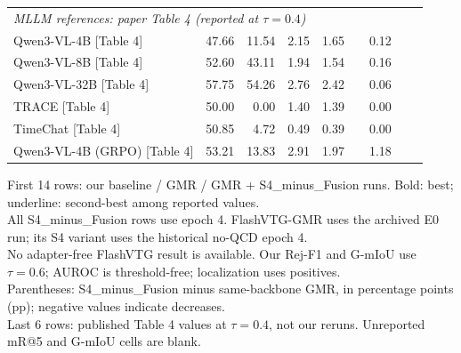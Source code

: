 \documentclass{article}
\begin{document}
\begin{table}[ht]
{\begin{tabular}{lrrrrrrrr}
\midrule
\multicolumn{9}{l}{\textit{MLLM references: paper Table 4 (reported at $\tau=0.4$)}} \\
Qwen3-VL-4B [Table 4] & 47.66 & 11.54 & 2.15 & 1.65 &  & 0.12 &  &  \\
Qwen3-VL-8B [Table 4] & 52.60 & 43.11 & 1.94 & 1.54 &  & 0.16 &  &  \\
Qwen3-VL-32B [Table 4] & 57.75 & 54.26 & 2.76 & 2.42 &  & 0.06 &  &  \\
TRACE [Table 4] & 50.00 & 0.00 & 1.40 & 1.39 &  & 0.00 &  &  \\
TimeChat [Table 4] & 50.85 & 4.72 & 0.49 & 0.39 &  & 0.00 &  &  \\
Qwen3-VL-4B (GRPO) [Table 4] & 53.21 & 13.83 & 2.91 & 1.97 &  & 1.18 &  &  \\
\bottomrule
\end{tabular}}
\par\smallskip\begin{minipage}{\textwidth}\footnotesize
First 14 rows: our baseline / GMR / GMR + S4\_minus\_Fusion runs. Bold: best; underline: second-best among reported values.\\
All S4\_minus\_Fusion rows use epoch 4. FlashVTG-GMR uses the archived E0 run; its S4 variant uses the historical no-QCD epoch 4.\\
No adapter-free FlashVTG result is available. Our Rej-F1 and G-mIoU use $\tau=0.6$; AUROC is threshold-free; localization uses positives.\\
Parentheses: S4\_minus\_Fusion minus same-backbone GMR, in percentage points (pp); negative values indicate decreases.\\
Last 6 rows: published Table 4 values at $\tau=0.4$, not our reruns. Unreported mR@5 and G-mIoU cells are blank.
\end{minipage}
\end{table}
\end{document}
